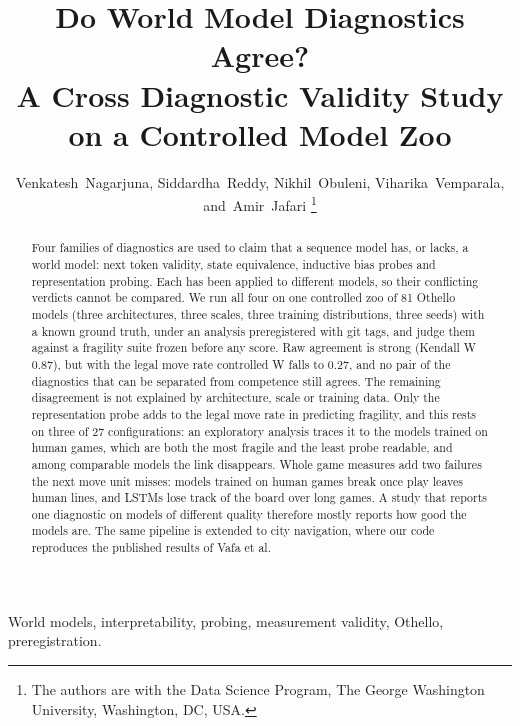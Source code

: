 \documentclass[journal]{IEEEtran}
\begin{document}
\title{Do World Model Diagnostics Agree?\\ A Cross Diagnostic Validity Study on a Controlled Model Zoo}

\author{Venkatesh~Nagarjuna, Siddardha~Reddy, Nikhil~Obuleni, Viharika~Vemparala, and~Amir~Jafari%
\thanks{The authors are with the Data Science Program, The George Washington University, Washington, DC, USA.}}

\maketitle

\begin{abstract}
Four families of diagnostics are used to claim that a sequence model has, or lacks, a world model: next token
validity, state equivalence, inductive bias probes and representation probing. Each has been applied to different
models, so their conflicting verdicts cannot be compared. We run all four on one controlled zoo of 81 Othello models
(three architectures, three scales, three training distributions, three seeds) with a known ground truth, under an
analysis preregistered with git tags, and judge them against a fragility suite frozen before any score. Raw
agreement is strong (Kendall W 0.87), but with the legal move rate controlled W falls to 0.27, and no pair of the
diagnostics that can be separated from competence still agrees. The remaining disagreement is not explained by
architecture, scale or training data. Only the representation probe adds to the legal move rate in predicting
fragility, and this rests on three of 27 configurations: an exploratory analysis traces it to the models trained on
human games, which are both the most fragile and the least probe readable, and among comparable models the link
disappears. Whole game measures add two failures the next move unit misses: models trained on human games break
once play leaves human lines, and LSTMs lose track of the board over long games. A study that reports one diagnostic
on models of different quality therefore mostly reports how good the models are. The same pipeline is extended to
city navigation, where our code reproduces the published results of Vafa et al.
\end{abstract}

\begin{IEEEkeywords}
World models, interpretability, probing, measurement validity, Othello, preregistration.
\end{IEEEkeywords}
\end{document}

